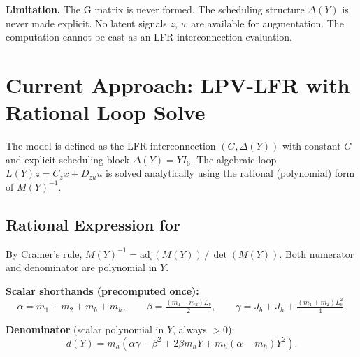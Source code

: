 \documentclass[11pt]{article}
\begin{document}
\medskip

\begin{mdframed}[backgroundcolor=oldcolor!8, linecolor=oldcolor, linewidth=1pt]
\textbf{Limitation.} The G matrix is never formed. The scheduling
structure $\Delta(Y)$ is never made explicit. No latent signals $z$, $w$
are available for augmentation. The computation cannot be cast as an
LFR interconnection evaluation.
\end{mdframed}

\section{Current Approach: LPV-LFR with Rational Loop Solve}

The model is defined as the LFR interconnection $(G,\Delta(Y))$ with
constant $G$ and explicit scheduling block $\Delta(Y) = YI_6$.
The algebraic loop $L(Y)z = C_z x + D_{zu}u$ is solved analytically
using the rational (polynomial) form of $M(Y)^{-1}$.

\subsection{Rational Expression for }

By Cramer's rule, $M(Y)^{-1} = \mathrm{adj}(M(Y))\,/\,\det(M(Y))$.
Both numerator and denominator are polynomial in $Y$.

\medskip
\noindent\textbf{Scalar shorthands (precomputed once):}
\[
  \alpha = m_1+m_2+m_b+m_h,
  \qquad
  \beta  = \tfrac{(m_1-m_2)L_b}{2},
  \qquad
  \gamma = J_b+J_h+\tfrac{(m_1+m_2)L_b^2}{4}.
\]

\noindent\textbf{Denominator} (scalar polynomial in $Y$, always $>0$):
\begin{equation}
  d(Y) = m_h\!\left(
    \alpha\gamma - \beta^2
    + 2\beta m_h Y
    + m_h(\alpha - m_h)Y^2
  \right).
  \label{eq:dY}
\end{equation}
\end{document}
